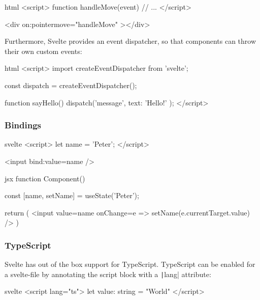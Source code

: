 \begin{myminted}[highlightlines={7}]{html}{}
<script>
    function handleMove(event) {
        // ...
    }
</script>

<div on:pointermove="{handleMove}" ></div>
\end{myminted}

Furthermore, Svelte provides an event dispatcher, so that components can throw their own custom events:

\begin{myminted}{html}{}
<script>
    import { createEventDispatcher } from 'svelte';

    const dispatch = createEventDispatcher();

    function sayHello() {
        dispatch('message', {
            text: 'Hello!'
        });
    }
</script>
\end{myminted}

\subsubsection{Bindings}


\begin{myminted}{svelte}{}
<script>
    let name = 'Peter';
</script>

<input bind:value={name} />
\end{myminted}

\begin{myminted}{jsx}{}
function Component() {
    const [name, setName] = useState('Peter');

    return ( 
        <input 
            value={name}
            onChange={e => setName(e.currentTarget.value)} 
        />
    )
}
\end{myminted}

\subsubsection{TypeScript}

Svelte has out of the box support for TypeScript. TypeScript can be enabled for a svelte-file by annotating the  script block with a \texttt|lang| attribute:

\begin{myminted}{svelte}{}
<script lang="ts">
    let value: string = "World"
</script>
\end{myminted}

